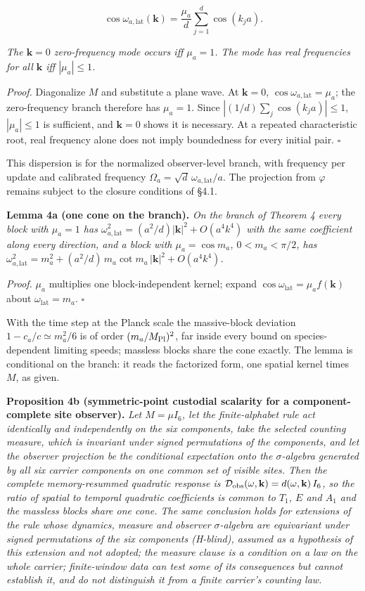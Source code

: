 \documentclass[
]{article}
\begin{document}
\[\cos\omega_{a,\mathrm{lat}}(\mathbf k)=\frac{\mu_a}{d}\sum_{j=1}^d\cos(k_ja).\]

\emph{The \(\mathbf k=0\) zero-frequency mode occurs iff \(\mu_a=1\).
The mode has real frequencies for all \(\mathbf k\) iff
\(|\mu_a|\le1\).}

\emph{Proof.} Diagonalize \(M\) and substitute a plane wave. At
\(\mathbf k=0\), \(\cos\omega_{a,\mathrm{lat}}=\mu_a\); the
zero-frequency branch therefore has \(\mu_a=1\). Since
\(|(1/d)\sum_j\cos(k_ja)|\le1\), \(|\mu_a|\le1\) is sufficient, and
\(\mathbf k=0\) shows it is necessary. At a repeated characteristic
root, real frequency alone does not imply boundedness for every initial
pair. \(\square\)

This dispersion is for the normalized observer-level branch, with
frequency per update and calibrated frequency
\(\Omega_a=\sqrt d\,\omega_{a,\mathrm{lat}}/a\). The projection from
\(\varphi\) remains subject to the closure conditions of §4.1.

\textbf{Lemma 4a (one cone on the branch).} \emph{On the branch of
Theorem 4 every block with \(\mu_a=1\) has
\(\omega_{a,\mathrm{lat}}^2=(a^2/d)|\mathbf k|^2+O(a^4k^4)\) with the
same coefficient along every direction, and a block with
\(\mu_a=\cos m_a\), \(0<m_a<\pi/2\), has
\(\omega_{a,\mathrm{lat}}^2=m_a^2+(a^2/d)\,m_a\cot m_a\,|\mathbf k|^2+O(a^4k^4)\).}

\emph{Proof.} \(\mu_a\) multiplies one block-independent kernel; expand
\(\cos\omega_{\mathrm{lat}}=\mu_af(\mathbf k)\) about
\(\omega_{\mathrm{lat}}=m_a\). \(\square\)

With the time step at the Planck scale the massive-block deviation
\(1-c_a/c\simeq m_a^2/6\) is of order \((m_a/M_{\rm Pl})^2\), far inside
every bound on species-dependent limiting speeds; massless blocks share
the cone exactly. The lemma is conditional on the branch: it reads the
factorized form, one spatial kernel times \(M\), as given.

\textbf{Proposition 4b (symmetric-point custodial scalarity for a
component-complete site observer).} \emph{Let \(M=\mu I_6\), let the
finite-alphabet rule act identically and independently on the six
components, take the selected counting measure, which is invariant under
signed permutations of the components, and let the observer projection
be the conditional expectation onto the \(\sigma\)-algebra generated by
all six carrier components on one common set of visible sites. Then the
complete memory-resummed quadratic response is
\(\mathcal D_{\rm obs}(\omega,\mathbf k)=d(\omega,\mathbf k)\,I_6\), so
the ratio of spatial to temporal quadratic coefficients is common to
\(T_1\), \(E\) and \(A_1\) and the massless blocks share one cone. The
same conclusion holds for extensions of the rule whose dynamics, measure
and observer \(\sigma\)-algebra are equivariant under signed
permutations of the six components (H-blind), assumed as a hypothesis of
this extension and not adopted; the measure clause is a condition on a
law on the whole carrier; finite-window data can test some of its
consequences but cannot establish it, and do not distinguish it from a
finite carrier's counting law.}
\end{document}
